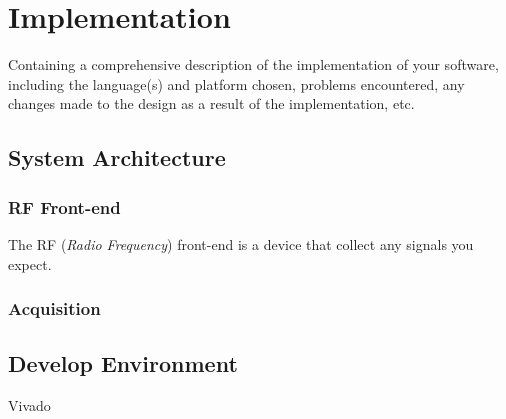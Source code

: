 \chapter{Implementation}

Containing a comprehensive description of the implementation of your software, including the language(s) and platform chosen, problems encountered, any changes made to the design as a result of the implementation, etc.

\section{System Architecture}
\subsection{RF Front-end}
The RF (\textit{Radio Frequency}) front-end is a device that collect any signals you expect.

\subsection{Acquisition}
\section{Develop Environment} 
Vivado


